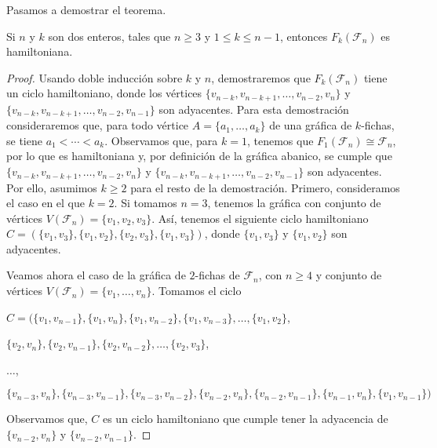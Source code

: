 Pasamos a demostrar el teorema.
    
\begin{teorema}
\label{teo:hamilt-SFan}
    Si $n$ y $k$ son dos enteros, tales que $n \geq 3$ y $1 \leq k \leq n-1$,
    entonces $F_k(\mathcal{F}_n)$ es hamiltoniana.
\end{teorema}
    
\begin{proof}
    Usando doble inducci\'on sobre $k$ y $n$, demostraremos que
    $F_k(\mathcal{F}_n)$ tiene un ciclo hamiltoniano, donde los v\'ertices
    $\{v_{n-k}, v_{n-k+1}, \dots, v_{n-2}, v_n\}$ y $\{v_{n-k}, v_{n-k+1},
    \dots, v_{n-2}, v_{n-1}\}$ son adyacentes. Para esta demostraci\'on
    consideraremos que, para todo v\'ertice $A = \{a_1, \dots, a_k\}$ de una
    gr\'afica de $k$-fichas, se tiene $a_1 < \cdots < a_k$. Observamos que, para
    $k =1$, tenemos que $F_1(\mathcal{F}_n) \cong \mathcal{F}_n$, por lo que es
    hamiltoniana y, por definici\'on de la gr\'afica abanico, se cumple que
    $\{v_{n-k}, v_{n-k+1}, \dots, v_{n-2}, v_n\}$ y $\{v_{n-k}, v_{n-k+1},
    \dots, v_{n-2}, v_{n-1}\}$ son adyacentes. Por ello, asumimos $k \geq 2$
    para el resto de la demostraci\'on. Primero, consideramos el caso en el que
    $k =2$. Si tomamos $n = 3$, tenemos la gr\'afica con conjunto de v\'ertices
    $V(\mathcal{F}_n)=\{v_1, v_2, v_3\}$. As\'i, tenemos el siguiente ciclo
    hamiltoniano $C= (\{v_1,v_3\},\{v_1,v_2\},\{v_2,v_3\}, \{v_1,v_3\})$, donde
    $\{v_1, v_3\}$ y $\{v_1, v_2\}$ son adyacentes. 
            
    Veamos ahora el caso de la gr\'afica de $2$-fichas de $\mathcal{F}_n$, con
    $n \geq 4$ y conjunto de v\'ertices $V(\mathcal{F}_n)=\{v_1,\dots, v_n\}$.
    Tomamos el ciclo
    
    \noindent
    $C = (\{v_1, v_{n-1}\},\{v_1, v_n\},\{v_1, v_{n-2}\}, \{v_1, v_{n-3}\},
    \dots, \{v_1, v_2\}$,
    
    \noindent
    $\{v_2, v_n\}, \{v_2, v_{n-1}\}, \{v_2, v_{n-2}\}, \dots, \{v_2,v_3\}$,
    
    \noindent
    $ \dots$,
    
    \noindent
    $\{v_{n-3},v_n\}, \{v_{n-3}, v_{n-1}\},\{v_{n-3},v_{n-2}\}, \{v_{n-2},
    v_n\},\{v_{n-2}, v_{n-1}\}, \{v_{n-1}, v_n\}, \{v_1, v_{n-1}\})$
    
    Observamos que, $C$ es un ciclo hamiltoniano que cumple tener la adyacencia
    de  $\{v_{n-2}, v_n\}$ y $\{v_{n-2}, v_{n-1}\}$. 
    

\end{proof}
